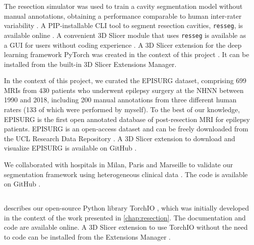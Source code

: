 The resection simulator was used to train a cavity segmentation model without manual annotations, obtaining a performance comparable to human inter-rater variability \cite{perez-garcia_simulation_2020}.
A \ac{PIP}-installable \ac{CLI} tool to segment resection cavities, \texttt{resseg}, is available online%
.
A convenient 3D Slicer module that uses \texttt{resseg} is available as a \ac{GUI} for users without coding experience%
.
A 3D Slicer extension for the deep learning framework PyTorch was created in the context of this project%
.
It can be installed from the built-in 3D Slicer Extensions Manager.

In the context of this project, we curated the EPISURG dataset, comprising 699 \acp{MRI} from 430 patients who underwent epilepsy surgery at the \ac{NHNN} between 1990 and 2018, including 200 manual annotations from three different human raters (133 of which were performed by myself).
To the best of our knowledge, EPISURG is the first open annotated database of post-resection \ac{MRI} for epilepsy patients.
EPISURG is an open-access dataset and can be freely downloaded from the UCL Research Data Repository \cite{perez-garcia_episurg_2020}.
A 3D Slicer extension to download and visualize EPISURG is available on GitHub%
.

We collaborated with hospitals in Milan, Paris and Marseille to validate our segmentation framework using heterogeneous clinical data \cite{perez-garcia_self-supervised_2021}.
The code is available on GitHub%
.


\subsection{}

 describes our open-source Python library TorchIO \cite{perez-garcia_torchio_2021}, which was initially developed in the context of the work presented in \cref{chap:resection}.
The documentation%
and code%
are available online.
A 3D Slicer extension to use TorchIO without the need to code can be installed from the Extensions Manager%
.
